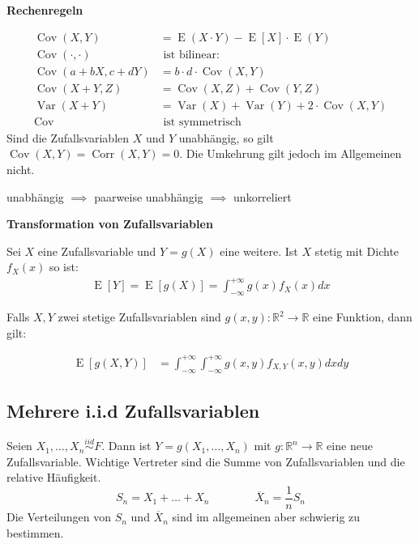 \documentclass[25pt]{sciposter}
\newcommand{\R}{\mathbb{R}}
\newcommand{\Var}{\operatorname{Var}}
\newcommand{\E}{\operatorname{E}}
\newenvironment{thm}[1]{\begin{mdframed}[backgroundcolor=pink!20,innertopmargin=15pt, innerbottommargin=15pt, nobreak=true]
		\textbf{#1 }
	}
	{ 
	\end{mdframed}
}
\begin{document}
\begin{multicols}{3}
\begin{thm}{Rechenregeln}
	\begin{align*}
	\operatorname{Cov}(X,Y) &= \E(X\cdot Y) - \E[X] \cdot \E(Y) \\
	\operatorname{Cov}(\cdot,\cdot) &\text{ ist bilinear:} \quad \\
	\operatorname{Cov}(a+bX,c+dY) &= b\cdot d \cdot \operatorname{Cov} (X,Y) \\
	\operatorname{Cov}(X+Y,Z) &= \operatorname{Cov}(X,Z)+\operatorname{Cov}(Y,Z) \\
	\Var(X+Y) &= \Var(X)+\Var(Y)+2 \cdot \operatorname{Cov}(X,Y) \\
	\operatorname{Cov} &\text{ ist symmetrisch}
	\end{align*}
	Sind die Zufallsvariablen $X$ und $Y$ unabhängig, so gilt $\operatorname{Cov}(X,Y) = \operatorname{Corr}(X,Y) = 0$.
	Die Umkehrung gilt jedoch im Allgemeinen nicht.
\end{thm}



\begin{mdframed}
	\centering
	{unabhängig $\implies$ paarweise unabhängig $\implies$ unkorreliert}
\end{mdframed}


\begin{thm}{Transformation von Zufallsvariablen}
	Sei $X$ eine Zufallsvariable und $Y=g(X)$ eine weitere. Ist $X$ stetig mit Dichte $f_X(x)$ so ist:
	\begin{align*}
		\E[Y] = \E[g(X)] = \int_{-\infty}^{+\infty} g(x) f_X(x) dx
	\end{align*}
	
	Falls $X,Y$ zwei stetige Zufallsvariablen sind $g(x,y) : \R^2 \to \R$ eine Funktion, dann gilt:
	
	\begin{align*}
		\E[g(X,Y)] &= \int_{-\infty}^{+\infty} \int_{-\infty}^{+\infty} g(x,y) f_{X,Y}(x,y) dx dy
	\end{align*}
	
\end{thm}




\subsection*{Mehrere i.i.d Zufallsvariablen}

Seien $X_1,\ldots,X_n \overset{iid}{\sim} F$. Dann ist $Y=g(X_1,\ldots,X_n)$ mit $g: \R^n \longrightarrow \R$ eine neue Zufallsvariable.
Wichtige Vertreter sind die Summe von Zufallsvariablen und die relative Häufigkeit.
\[ S_n = X_1 + \ldots + X_n \qquad \qquad\overline{X}_n = \dfrac{1}{n} S_n \]
Die Verteilungen von $S_n$ und $\overline X_n$ sind im allgemeinen aber schwierig zu bestimmen.


\end{multicols}
\end{document}
